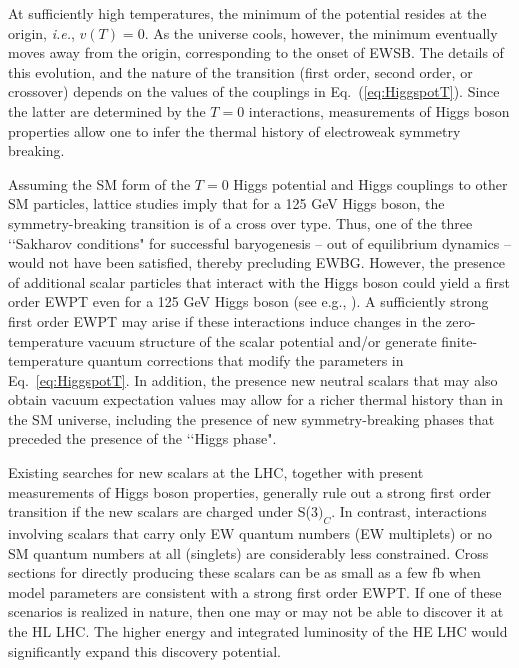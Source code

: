 At sufficiently high temperatures, the minimum of the potential resides at the origin, {\it i.e.}, $v(T) = 0$. As the universe cools, however, the minimum eventually moves away from the origin, corresponding to the onset of EWSB. The details of this evolution, and the nature of the transition (first order, second order, or crossover) depends on the values of the couplings in Eq.~(\ref{eq:HiggspotT}). Since the latter are determined by the $T=0$ interactions, measurements of Higgs boson properties allow one to infer the thermal history of electroweak symmetry breaking. 

Assuming the SM form of the $T=0$ Higgs potential and Higgs couplings to other SM particles, lattice studies imply that for a 125 GeV Higgs boson, the symmetry-breaking transition is of a cross over type\cite{Rummukainen:1998as,Csikor:1998eu,Laine:1998jb,Gurtler:1997hr}. Thus, one of the three \lq\lq Sakharov conditions" for successful baryogenesis\cite{Sakharov:1967dj} -- out of equilibrium dynamics -- would not have been satisfied, thereby precluding EWBG. However, the presence of additional scalar particles that interact with the Higgs boson could yield a first order EWPT even for a 125 GeV Higgs boson (see e.g., \cite{Morrissey:2012db,Assamagan:2016azc}). A sufficiently strong first order EWPT may arise if these interactions induce changes in the zero-temperature vacuum structure of the scalar potential and/or generate finite-temperature quantum corrections that modify the parameters in Eq.~\eqref{eq:HiggspotT}. In addition, the presence new neutral scalars that may also obtain vacuum expectation values may allow for a richer thermal history than in the SM universe, including the presence of new symmetry-breaking phases that preceded the presence of the \lq\lq Higgs phase"\cite{Patel:2012pi,Patel:2013zla,Blinov:2015sna}. 

 Existing searches for new scalars at the LHC, together with present measurements of Higgs boson properties, generally rule out a strong first order transition if the new scalars are charged under S(3$)_C$\cite{Katz:2014bha,Katz:2015uja}. In contrast, interactions involving scalars that carry only EW quantum numbers (EW multiplets) or no SM quantum numbers at all (singlets) are considerably less constrained. Cross sections for directly producing these scalars can be as small as a few fb when model parameters are consistent with a strong first order EWPT. If one of these scenarios is realized in nature, then one may or may not be able to discover it at the HL LHC. The higher energy and integrated luminosity of the HE LHC would significantly expand this discovery potential. 

